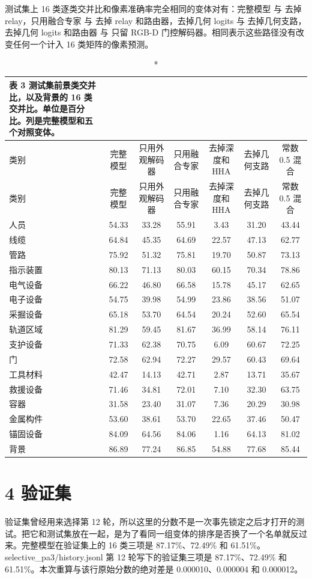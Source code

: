 \documentclass[11pt]{article}
\begin{document}
测试集上 16 类逐类交并比和像素准确率完全相同的变体对有：完整模型 与 去掉 relay，只用融合专家 与 去掉 relay 和路由器，去掉几何 logits 与 去掉几何支路，去掉几何 logits 和路由器 与 只留 RGB-D 门控解码器。相同表示这些路径没有改变任何一个计入 16 类矩阵的像素预测。

{\footnotesize\setlength{\tabcolsep}{3pt}
\begin{longtable}{lcccccc}
\caption*{表 3  测试集前景类交并比，以及背景的 16 类交并比。单位是百分比。列是完整模型和五个对照变体。}\\
\toprule
类别 & 完整模型 & 只用外观解码器 & 只用融合专家 & 去掉深度和 HHA & 去掉几何支路 & 常数 0.5 混合\\
\midrule
\endfirsthead
\toprule
类别 & 完整模型 & 只用外观解码器 & 只用融合专家 & 去掉深度和 HHA & 去掉几何支路 & 常数 0.5 混合\\
\midrule
\endhead
人员 & 54.33 & 33.28 & 55.91 & 3.43 & 31.20 & 43.44\\
线缆 & 64.84 & 45.35 & 64.69 & 22.57 & 47.13 & 62.77\\
管路 & 75.92 & 51.32 & 75.81 & 19.70 & 50.87 & 73.13\\
指示装置 & 80.13 & 71.13 & 80.03 & 60.15 & 70.34 & 78.86\\
电气设备 & 66.22 & 46.80 & 66.58 & 15.78 & 45.17 & 62.65\\
电子设备 & 54.75 & 39.98 & 54.99 & 23.86 & 38.56 & 51.07\\
采掘设备 & 65.18 & 53.70 & 64.54 & 20.24 & 52.60 & 65.54\\
轨道区域 & 81.29 & 59.45 & 81.67 & 36.99 & 58.14 & 76.11\\
支护设备 & 71.33 & 62.38 & 70.75 & 6.09 & 60.67 & 72.25\\
门 & 72.58 & 62.94 & 72.27 & 29.57 & 60.43 & 69.64\\
工具材料 & 42.47 & 14.13 & 42.71 & 2.87 & 13.71 & 35.67\\
救援设备 & 71.46 & 34.81 & 72.01 & 7.10 & 32.30 & 63.75\\
容器 & 31.58 & 23.40 & 31.07 & 7.36 & 20.29 & 30.98\\
金属构件 & 53.60 & 38.61 & 53.70 & 22.65 & 37.46 & 50.47\\
锚固设备 & 84.09 & 64.56 & 84.06 & 1.16 & 64.13 & 81.02\\
背景 & 86.89 & 77.24 & 86.85 & 54.88 & 77.68 & 85.44\\
\bottomrule
\end{longtable}
}
\section*{4  验证集}
验证集曾经用来选择第 12 轮，所以这里的分数不是一次事先锁定之后才打开的测试。把它和测试集放在一起，是为了看同一组变体的排序是否换了一个名单就反过来。完整模型在验证集上的 16 类三项是 87.17\%、72.49\% 和 61.51\%。selective\_pa3/history.jsonl 第 12 轮写下的验证集三项是 87.17\%、72.49\% 和 61.51\%。本次重算与该行原始分数的绝对差是 0.000010、0.000004 和 0.000012。
\end{document}

